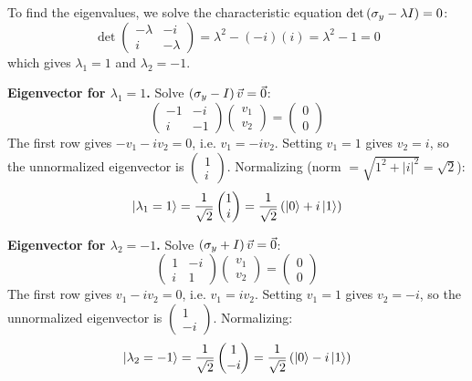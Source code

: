 \documentclass[a4paper, 10pt]{article}
\begin{document}
\begin{solution}
	To find the eigenvalues, we solve the characteristic equation \( \det\left(\sigma_y - \lambda I\right) = 0 \):
	\[
		\det\begin{pmatrix}
			-\lambda & -i       \\
			i        & -\lambda
		\end{pmatrix} = \lambda^2 - (-i)(i) = \lambda^2 - 1 = 0
	\]
	which gives \( \lambda_1 = 1 \) and \( \lambda_2 = -1 \).

	\textbf{Eigenvector for \( \lambda_1 = 1 \).} Solve \( \left(\sigma_y - I\right)\vec{v} = \vec{0} \):
	\[
		\begin{pmatrix}
			-1 & -i \\
			i  & -1
		\end{pmatrix}
		\begin{pmatrix}
			v_1 \\ v_2
		\end{pmatrix} = \begin{pmatrix}
			0 \\ 0
		\end{pmatrix}
	\]
	The first row gives \( -v_1 - i v_2 = 0 \), i.e. \( v_1 = -i v_2 \). Setting \( v_1 = 1 \) gives \( v_2 = i \), so the unnormalized eigenvector is \( \begin{pmatrix} 1 \\ i \end{pmatrix} \). Normalizing (norm \( = \sqrt{1^2 + |i|^2} = \sqrt{2} \)):
	\[
		\ket{\lambda_1 = 1} = \frac{1}{\sqrt{2}}\begin{pmatrix}
			1 \\ i
		\end{pmatrix} = \frac{1}{\sqrt{2}}\left(\ket{0} + i\ket{1}\right)
	\]

	\textbf{Eigenvector for \( \lambda_2 = -1 \).} Solve \( \left(\sigma_y + I\right)\vec{v} = \vec{0} \):
	\[
		\begin{pmatrix}
			1 & -i \\
			i & 1
		\end{pmatrix}
		\begin{pmatrix}
			v_1 \\ v_2
		\end{pmatrix} = \begin{pmatrix}
			0 \\ 0
		\end{pmatrix}
	\]
	The first row gives \( v_1 - i v_2 = 0 \), i.e. \( v_1 = i v_2 \). Setting \( v_1 = 1 \) gives \( v_2 = -i \), so the unnormalized eigenvector is \( \begin{pmatrix} 1 \\ -i \end{pmatrix} \). Normalizing:
	\[
		\ket{\lambda_2 = -1} = \frac{1}{\sqrt{2}}\begin{pmatrix}
			1 \\ -i
		\end{pmatrix} = \frac{1}{\sqrt{2}}\left(\ket{0} - i\ket{1}\right)
	\]


\end{solution}
\end{document}
